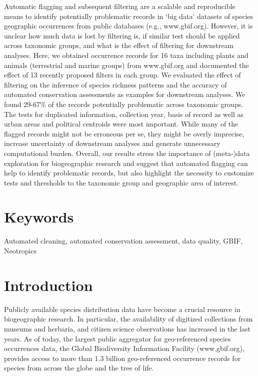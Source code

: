 \documentclass[
  12pt,
]{article}
\begin{document}
Automatic flagging and subsequent filtering are a scalable and reproducible means to identify potentially problematic records in `big data' datasets of species geographic occurrences from public databases (e.g., www.gbif.org). However, it is unclear how much data is lost by filtering is, if similar test should be applied across taxonomic groups, and what is the effect of filtering for downstream analyses. Here, we obtained occurrence records for 16 taxa including plants and animals (terrestrial and marine groups) from www.gbif.org and documented the effect of 13 recently proposed filters in each group. We evaluated the effect of filtering on the inference of species richness patterns and the accuracy of automated conservation assessments as examples for downstream analyses. We found 29-67\% of the records potentially problematic across taxonomic groups. The tests for duplicated information, collection year, basis of record as well as urban areas and political centroids were most important. While many of the flagged records might not be erroneous per se, they might be overly imprecise, increase uncertainty of downstream analyses and generate unnecessary computational burden. Overall, our results stress the importance of (meta-)data exploration for biogeographic research and suggest that automated flagging can help to identify problematic records, but also highlight the necessity to customize tests and thresholds to the taxonomic group and geographic area of interest.

\hypertarget{keywords}{%
\section{Keywords}\label{keywords}}

Automated cleaning, automated conservation assessment, data quality, GBIF, Neotropics

\newpage{}

\hypertarget{introduction}{%
\section{Introduction}\label{introduction}}

Publicly available species distribution data have become a crucial resource in biogeographic research. In particular, the availability of digitized collections from museums and herbaria, and citizen science observations has increased in the last years. As of today, the largest public aggregator for geo-referenced species occurrences data, the Global Biodiversity Information Facility (www.gbif.org), provides access to more than 1.3 billion geo-referenced occurrence records for species from across the globe and the tree of life.
\end{document}
